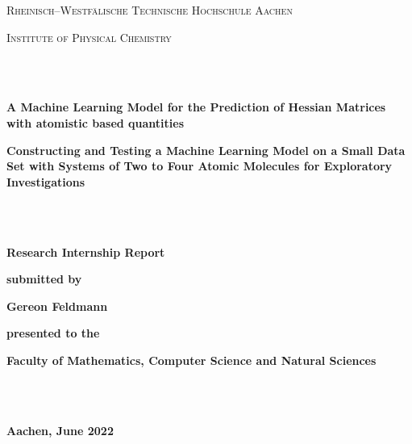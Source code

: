 \documentclass[listof= totoc]{scrreprt}
\author{Gereon Feldmann}
\numberwithin{equation}{section}
\begin{document}
	\thispagestyle{empty}
	\begin{center}
		\textsc{\large{Rheinisch--Westfälische Technische Hochschule Aachen}}
	\end{center}
	\begin{center}
		\textsc{\large{Institute of Physical Chemistry}}
	\end{center}
	\begin{verbatim}
		
		
	\end{verbatim}
	
	\begin{center}
		\vspace*{4pt}
		\textbf{\Huge{A Machine Learning Model for the Prediction of Hessian Matrices with atomistic based quantities}}
	\end{center}

	\begin{center}
		\vspace*{4pt}
		\textbf{\Large{Constructing and Testing a Machine Learning Model on a Small Data Set with Systems of Two to Four Atomic Molecules for Exploratory Investigations}}
	\end{center}
	\begin{verbatim}

		
	\end{verbatim}
	\begin{center}
		\textbf{\Large{Research Internship Report}}
	\end{center}
	\begin{center}
		\textbf{submitted by}
	\end{center}
	\begin{center}
		\textbf{\Large{Gereon Feldmann}}
	\end{center}
	\begin{center}
		\textbf{presented to the}
	\end{center}
	\begin{center}
		\textbf{\Large{Faculty of Mathematics, Computer Science and Natural Sciences}}
	\end{center}
	\begin{verbatim}
		
		
	\end{verbatim}
	\begin{center}
		\textbf{\Large{Aachen, June 2022}}
	\end{center}
	
\end{document}
